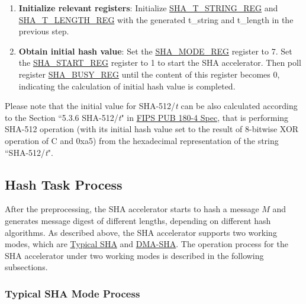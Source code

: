 \documentclass[main\_\_EN.tex]{subfiles}
\begin{document}
\begin{enumerate}
\begin{itemize}
        For example, if {\it{t}} = 231, then $t_0$ = 1, $t_1$ = 3, $t_2$ = 2, and $t\_string$ = $32'h32333180$.

    \end{itemize}
    \item \textbf{Initialize relevant registers}: Initialize \hyperref[regdesc:SHATSTRINGREG]{SHA\_T\_STRING\_REG} and  \hyperref[regdesc:SHATLENGTHREG]{SHA\_T\_LENGTH\_REG} with the generated t\_string and t\_length in the previous step.

    \item \textbf{Obtain initial hash value}: Set the \hyperref[regdesc:SHAMODEREG]{SHA\_MODE\_REG} register to 7. Set the \hyperref[regdesc:SHASTARTREG]{SHA\_START\_REG} register to 1 to start the SHA accelerator. Then poll register \hyperref[regdesc:SHABUSYREG]{SHA\_BUSY\_REG} until the content of this register becomes 0, indicating the calculation of initial hash value is completed.
\end{enumerate}

Please note that the initial value for SHA-512/{\it{t}} can be also calculated according to the Section ``5.3.6 SHA-512/{\it{t}}" in \href{https://doi.org/10.6028/NIST.FIPS.180-4}{FIPS PUB 180-4 Spec}, that is performing SHA-512 operation (with its initial hash value set to the result of 8-bitwise XOR operation of C and 0x{}a5) from the hexadecimal representation of the string ``SHA-512/{\it{t}}".

\subsection{Hash Task Process}\label{sec:sha-hash-operation}

After the preprocessing, the \chipname{} SHA accelerator starts to hash a message \begin{math}M\end{math} and generates message digest of different lengths, depending on different hash algorithms. As described above, the \chipname{} SHA accelerator supports two working modes, which are \hyperref[sec:sha-typical-sha]{Typical SHA} and \hyperref[sec:sha-dma-sha]{DMA-SHA}. The
operation process for the SHA accelerator under two working modes is described in the following subsections.

\subsubsection{Typical SHA Mode Process}\label{sec:sha-typical-sha}
\end{document}

